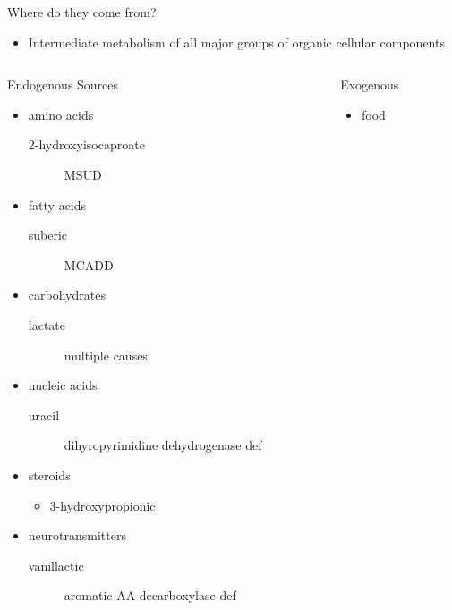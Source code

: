 \documentclass[presentation]{beamer}
\begin{document}
\begin{frame}[label={sec:orgheadline6}]{Where do they come from?}
\begin{itemize}
\item Intermediate metabolism of all major groups of organic cellular
components
\end{itemize}

\begin{columns}
\begin{column}{0.45\columnwidth}
\begin{block}{Endogenous Sources}
\begin{itemize}
\item amino acids
\begin{description}
\item[{2-hydroxyisocaproate}] MSUD
\end{description}
\item fatty acids
\begin{description}
\item[{suberic}] MCADD
\end{description}
\item carbohydrates
\begin{description}
\item[{lactate}] multiple causes
\end{description}
\item nucleic acids
\begin{description}
\item[{uracil}] dihyropyrimidine dehydrogenase def
\end{description}
\item steroids
\begin{itemize}
\item 3-hydroxypropionic
\end{itemize}
\item neurotransmitters
\begin{description}
\item[{vanillactic}] aromatic AA decarboxylase def
\end{description}
\end{itemize}
\end{block}
\end{column}
\begin{column}{0.5\columnwidth}
\begin{block}{Exogenous}
\begin{itemize}
\item food
\begin{itemize}

\end{itemize}
\end{itemize}
\end{block}
\end{column}
\end{columns}
\end{frame}
\end{document}
